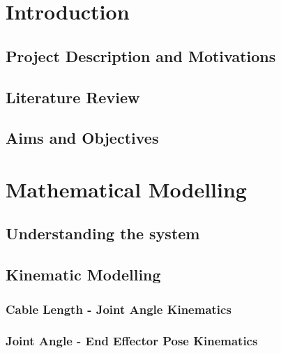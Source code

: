 \documentclass[a4paper,12pt]{report}
\begin{document}
\pagebreak



\tableofcontents

\pagebreak

\begin{abstract}
    
    
\end{abstract}

\chapter{Introduction}
\section{Project Description and Motivations}

\section{Literature Review}

\section{Aims and Objectives}



\chapter{Mathematical Modelling}

\section{Understanding the system}


\section{Kinematic Modelling}


\subsection{Cable Length - Joint Angle Kinematics}

\subsection{Joint Angle - End Effector Pose Kinematics}
\end{document}
